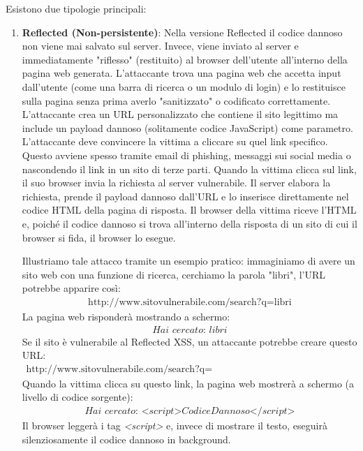 Esistono due tipologie principali:

\begin{enumerate}
    \item \textbf{Reflected (Non-persistente)}: Nella versione Reflected 
    il codice dannoso non viene mai salvato sul server. Invece, viene 
    inviato al server e immediatamente "riflesso" (restituito) al browser 
    dell'utente all'interno della pagina web generata.
    L'attaccante trova una pagina web che accetta input dall'utente (come 
    una barra di ricerca o un modulo di login) e lo restituisce sulla 
    pagina senza prima averlo "sanitizzato" o codificato correttamente.
    L'attaccante crea un URL personalizzato che contiene il sito legittimo 
    ma include un payload dannoso (solitamente codice JavaScript) come 
    parametro. L'attaccante deve convincere la vittima a cliccare su quel 
    link specifico. Questo avviene spesso tramite email di phishing, 
    messaggi sui social media o nascondendo il link in un sito di terze 
    parti. Quando la vittima clicca sul link, il suo browser invia la 
    richiesta al server vulnerabile. Il server elabora la richiesta, 
    prende il payload dannoso dall'URL e lo inserisce direttamente nel 
    codice HTML della pagina di risposta. Il browser della vittima riceve 
    l'HTML e, poiché il codice dannoso si trova all'interno della risposta 
    di un sito di cui il browser si fida, il browser lo esegue.

    Illustriamo tale attacco tramite un esempio pratico: immaginiamo di avere
    un sito web con una funzione di ricerca, cerchiamo la parola "libri", l'URL
    potrebbe apparire così:
    \begin{gather*}
        \text{http://www.sitovulnerabile.com/search?q=libri}
    \end{gather*}
    La pagina web risponderà mostrando a schermo:
    \begin{gather*}
        \textit{Hai cercato: libri}
    \end{gather*}
    Se il sito è vulnerabile al Reflected XSS, un attaccante potrebbe 
    creare questo URL:
    \begin{gather*}
        \text{http://www.sitovulnerabile.com/search?q=<script>CodiceDannoso</script>}
    \end{gather*}
    Quando la vittima clicca su questo link, la pagina web mostrerà a 
    schermo (a livello di codice sorgente):
    \begin{gather*}
        \textit{Hai cercato: <script>CodiceDannoso</script>}
    \end{gather*}
    Il browser leggerà i tag \textit{<script>} e, invece di mostrare il testo, 
    eseguirà silenziosamente il codice dannoso in background.


\end{enumerate}
